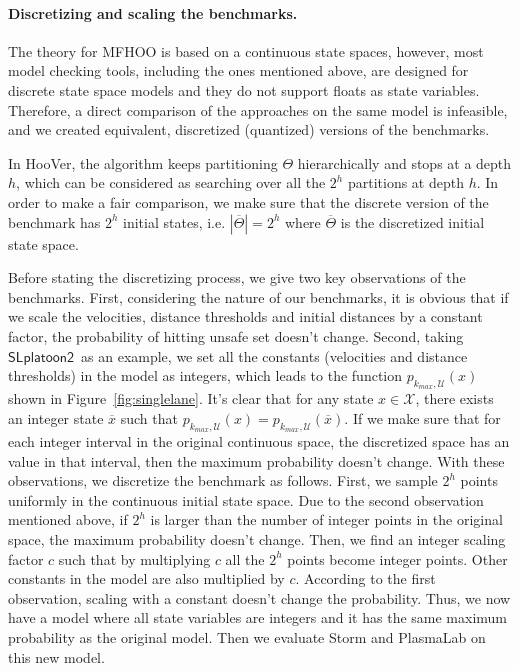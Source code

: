 \documentclass[11pt]{article}
\theoremstyle{definition}
\newcommand{\sayan}[1]{\textcolor{blue}{#1}}
\newcommand{\X}{\mathcal{X}}
\newcommand{\phit}[3]{{p_{#1,#2}{(#3)}}}
\newcommand{\Unsafe}{\mathcal{U}}
\newcommand{\SlplatoonTwo}{{$\mathsf{SLplatoon2}$\xspace}}
\newcommand{\toolname}{{{\sf HooVer}\xspace}}
\begin{document}

\paragraph{Discretizing and scaling the benchmarks.} The theory for  MFHOO is based on a continuous state spaces, however, most model checking tools, including the ones mentioned above, are designed for discrete state space models and they do not support floats as state variables. Therefore, a direct comparison of the approaches on the same model is infeasible, and we created equivalent, discretized (quantized) versions of the benchmarks.

In \toolname{}, the algorithm keeps partitioning $\Theta$ hierarchically and stops at a depth $h$, which can be considered as searching over all the $2^h$ partitions at depth $h$. In order to make a fair comparison, we make sure that the discrete version of the benchmark has $2^h$ initial states, i.e. $|\overline{\Theta}| = 2^h$ where $\overline{\Theta}$ is the discretized initial state space.

Before stating the discretizing process, we give two key observations of the benchmarks. First, considering the nature of our benchmarks, it is obvious that if we scale the velocities, distance thresholds and initial distances by a constant factor, the probability of hitting unsafe set doesn't change. Second, taking \SlplatoonTwo\ as an example, we set all the constants (velocities and distance thresholds) in the model as integers, which leads to the function $\phit{k_{\mathit{max}}}{\Unsafe}{x}$ shown in Figure~\ref{fig:singlelane}. It's clear that for any state $x \in \X$, there exists an integer state $\overline{x}$ such that $\phit{k_{\mathit{max}}}{\Unsafe}{x} = \phit{k_{\mathit{max}}}{\Unsafe}{\overline{x}}$. If we make sure that for each integer interval in the original continuous space, the discretized space has an value in that interval, then the maximum probability doesn't change. With these observations, we discretize the benchmark as follows. First, we sample $2^h$ points uniformly in the continuous initial state space. Due to the second observation mentioned above, if $2^h$ is larger than the number of integer points in the original space, the maximum probability doesn't change. Then, we find an integer scaling factor $c$ such that by multiplying $c$ all the $2^h$ points become integer points. Other constants in the model are also multiplied by $c$. According to the first observation, scaling with a constant doesn't change the probability. Thus, we now have a model where all state variables are integers and it has the same maximum probability as the original model. Then we evaluate Storm and PlasmaLab on this new model.
\end{document}
